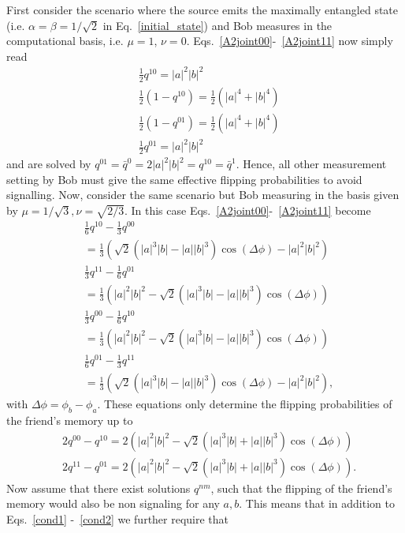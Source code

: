 \documentclass[a4paper,twocolumn,11pt,accepted=2017-05-09,dvipsnames]{quantumarticle}
\numberwithin{equation}{section}
\begin{document}
\begin{appendix}
First consider the scenario where the source emits the maximally entangled state (i.e. $\alpha=\beta=1/\sqrt{2}$ in Eq.~\eqref{initial_state}) and Bob measures in the computational basis, i.e. $\mu=1$, $\nu=0$. Eqs.~\eqref{A2joint00}-~\eqref{A2joint11} now simply read
\begin{align}
\nonumber
&\frac{1}{2}q^{10}=|a|^2|b|^2 \\
\nonumber
&\frac{1}{2}(1-q^{10})= \frac{1}{2} (|a|^4+|b|^4)\\
\nonumber
&\frac{1}{2}(1-q^{01})= \frac{1}{2} (|a|^4+|b|^4)\\
\nonumber
&\frac{1}{2}q^{01}=|a|^2|b|^2
\end{align}
and are solved by $q^{01}= \bar{q}^0=2|a|^2|b|^2=q^{10}=\bar{q}^1$. Hence, all other measurement setting by Bob must give the same effective flipping probabilities to avoid signalling. Now, consider the same scenario but Bob measuring in the basis given by $\mu= 1/\sqrt{3},\nu= \sqrt{2/3}$. In this case Eqs.~\eqref{A2joint00}-~\eqref{A2joint11} become 
\begin{align*}
\nonumber
&\frac{1}{6}q^{10}-\frac{1}{3}q^{00}\\
&=\frac{1}{3} \left(\sqrt{2}(|a|^3|b|-|a| |b|^3)\cos(\Delta\phi) - |a|^2|b|^2\right) \\
\nonumber
&\frac{1}{3}q^{11}-\frac{1}{6}q^{01}\\
&=\frac{1}{3} \left( |a|^2|b|^2-\sqrt{2}(|a|^3|b|-|a| |b|^3)\cos(\Delta\phi) \right) \\
\nonumber
&\frac{1}{3}q^{00}-\frac{1}{6}q^{10}\\
&=\frac{1}{3} \left( |a|^2|b|^2-\sqrt{2}(|a|^3|b|-|a| |b|^3)\cos(\Delta\phi) \right)\\
\nonumber
&\frac{1}{6}q^{01}-\frac{1}{3}q^{11}\\
&=\frac{1}{3} \left(\sqrt{2}(|a|^3|b|-|a| |b|^3)\cos(\Delta\phi)- |a|^2|b|^2\right),
\end{align*}
with $\Delta\phi=\phi_b-\phi_a$. These equations only determine the flipping probabilities of the friend's memory up to
\begin{align}
\label{cond1}
&2q^{00}-q^{10}=2 \left( |a|^2|b|^2-\sqrt{2}(|a|^3|b|+|a| |b|^3)\cos(\Delta\phi) \right) \\
\label{cond2}
&2q^{11}-q^{01}=2 \left( |a|^2|b|^2-\sqrt{2}(|a|^3|b|+|a| |b|^3)\cos(\Delta\phi) \right). 
\end{align}
Now assume that there exist solutions $q^{nm}$, such that the flipping of the friend's memory would also  be non signaling for any $a,b$. This means that in addition to Eqs.~\eqref{cond1} -~\eqref{cond2} we further require that

\end{appendix}
\end{document}
